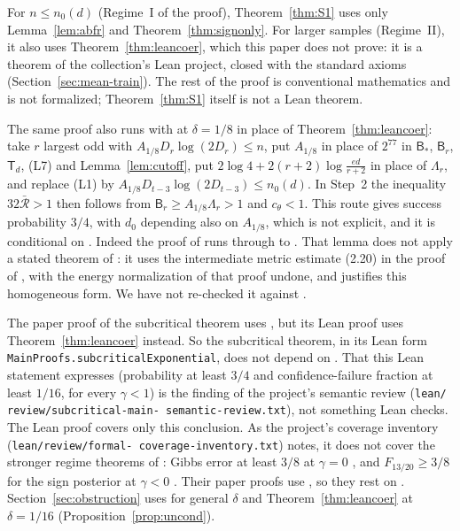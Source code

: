\begin{remark}\label{rem:S1status}
For $n\le n_0(d)$ (Regime~I of the proof), Theorem~\ref{thm:S1} uses only
Lemma~\ref{lem:abfr} and Theorem~\ref{thm:signonly}. For larger samples
(Regime~II), it also uses Theorem~\ref{thm:leancoer},
which this paper does not prove: it is a theorem of the collection's Lean
project, closed with the standard axioms (Section~\ref{sec:mean-train}).
The rest of the proof is conventional mathematics and is not formalized;
Theorem~\ref{thm:S1} itself is not a Lean theorem.

The same proof also runs with \cite[Lemma~4.4]{subcritical} at
$\delta=1/8$ in place of Theorem~\ref{thm:leancoer}: take $r$ largest odd
with $A_{1/8}D_r\log(2D_r)\le n$, put $A_{1/8}$ in place of $2^{77}$ in
$\mathsf B_*$, $\mathsf B_r$, $\mathsf T_d$, (L7) and
Lemma~\ref{lem:cutoff}, put $2\log4+2(r+2)\log\frac{ed}{r+2}$ in place of
$\Lambda_r$, and replace (L1) by
$A_{1/8}D_{t-3}\log(2D_{t-3})\le n_0(d)$. In Step~2 the inequality
$32\bar{\mathcal R}>1$ then follows from $\mathsf B_r\ge A_{1/8}\Lambda_r>1$
and $c_\theta<1$. This route gives success probability
$3/4$, with $d_0$ depending also on $A_{1/8}$, which is not explicit, and
it is conditional on \cite[Lemma~4.1]{subcritical}. Indeed the proof of
\cite[Lemma~4.4]{subcritical} runs through \cite[Lemma~4.3]{subcritical}
to \cite[Lemma~4.1]{subcritical}. That lemma does not apply a stated
theorem of \cite{lee}: it uses the intermediate metric estimate (2.20) in
the proof of \cite[Lemma~2.12]{lee}, with the energy normalization of that
proof undone, and \cite[Remark~4.2]{subcritical} justifies this homogeneous
form. We have not re-checked it against \cite{lee}.

The paper proof of the subcritical theorem \cite[Theorem~1.1]{subcritical}
uses \cite[Lemma~4.4]{subcritical}, but its Lean proof uses
Theorem~\ref{thm:leancoer} instead. So the subcritical theorem, in its Lean
form \texttt{MainProofs.\allowbreak subcriticalExponential}, does not
depend on \cite[Lemma~4.1]{subcritical}. That this Lean statement
expresses \cite[Theorem~1.1]{subcritical} (probability at least $3/4$ and
confidence-failure fraction at least $1/16$, for every $\gamma<1$) is the
finding of the project's semantic review (\texttt{lean/\allowbreak
review/\allowbreak subcritical-\allowbreak main-\allowbreak
semantic-\allowbreak review.txt}), not something Lean checks. The Lean
proof covers only this conclusion. As the project's coverage inventory
(\texttt{lean/\allowbreak review/\allowbreak formal-\allowbreak
coverage-\allowbreak inventory.txt}) notes, it does not cover the stronger
regime theorems of \cite{subcritical}: Gibbs error at least $3/8$ at
$\gamma=0$ \cite[Theorem~9.2]{subcritical}, and $F_{13/20}\ge3/8$ for the
sign posterior at $\gamma<0$ \cite[Theorem~10.2]{subcritical}. Their paper
proofs use \cite[Lemma~4.4]{subcritical}, so they rest on
\cite[Lemma~4.1]{subcritical}. Section~\ref{sec:obstruction}
uses \cite[Lemma~4.4]{subcritical} for general $\delta$ and
Theorem~\ref{thm:leancoer} at $\delta=1/16$
(Proposition~\ref{prop:uncond}).


\end{remark}
